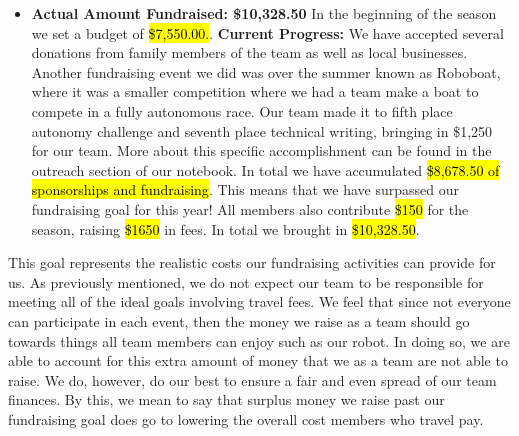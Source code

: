 \begin{itemize}
 \item \textbf{\Large Actual Amount Fundraised: \$10,328.50 }
  \newline 
In the beginning of the season we set a budget of \hl{\$7,550.00.}.
  \newline 
  \textbf{Current Progress: }We have accepted several donations from family members of the team as well as local businesses. Another fundraising event we did was over the summer known as Roboboat, where it was a smaller competition where we had a team make a boat to compete in a fully autonomous race. Our team made it to fifth place autonomy challenge and seventh place technical writing, bringing in \$1,250 for our team. More about this specific accomplishment can be found in the outreach section of our notebook. In total we have accumulated \hl{\$8,678.50 of sponsorships and fundraising}. This means that we have surpassed our fundraising goal for this year! All members also contribute \hl{\$150} for the season, raising \hl{\$1650} in fees. In total we brought in \hl{\$10,328.50}.
  
\end{itemize}

This goal represents the realistic costs our fundraising activities can provide for us. As previously mentioned, we do not expect our team to be responsible for meeting all of the ideal goals involving travel fees. We feel that since not everyone can participate in each event, then the money we raise as a team should go towards things all team members can enjoy such as our robot. In doing so, we are able to account for this extra amount of money that we as a team are not able to raise. We do, however, do our best to ensure a fair and even spread of our team finances. By this, we mean to say that surplus money we raise past our fundraising goal does go to lowering the overall cost members who travel pay. 


